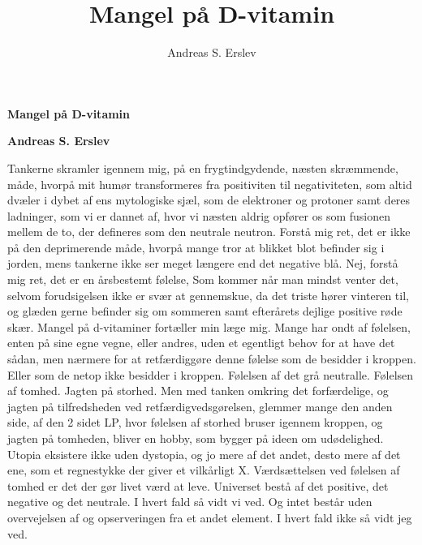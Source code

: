 \documentclass[]{article}
\title{Mangel på D-vitamin}
\author{Andreas S. Erslev}
\begin{document}
	
	\begin{center}
		\Large\textbf{Mangel på D-vitamin}
	\end{center}
	
	\begin{center}
		\large\textbf{Andreas S. Erslev}
	\end{center}
	
	Tankerne skramler igennem mig, på en frygtindgydende, næsten skræmmende, måde, hvorpå mit humør transformeres fra positiviten til negativiteten, som altid dvæler i dybet af ens mytologiske sjæl, som de elektroner og protoner samt deres ladninger, som vi er dannet af, hvor vi næsten aldrig opfører os som fusionen mellem de to, der defineres som den neutrale neutron.
	\newline
	\newline
	Forstå mig ret, det er ikke på den deprimerende måde, hvorpå mange tror at blikket blot befinder sig i jorden, mens tankerne ikke ser meget længere end det negative blå.
	\newline
	\newline
	Nej, forstå mig ret, det er en årsbestemt følelse, Som kommer når man mindst venter det, selvom forudsigelsen ikke er svær at gennemskue, da det triste hører vinteren til, og glæden gerne befinder sig om sommeren samt efterårets dejlige positive røde skær.
	\newline
	\newline
	Mangel på d-vitaminer fortæller min læge mig.
	\newline
	\newline
	Mange har ondt af følelsen, enten på sine egne vegne, eller andres, uden et egentligt behov for at have det sådan, men nærmere for at retfærdiggøre denne følelse som de besidder i kroppen. Eller som de netop ikke besidder i kroppen.
	\newline
	\newline
	Følelsen af det grå neutralle.
	\newline
	\newline
	Følelsen af tomhed. Jagten på storhed.
	\newline
	\newline
	Men med tanken omkring det forfærdelige, og jagten på tilfredsheden ved retfærdigvedsgørelsen, glemmer mange den anden side, af den 2 sidet LP, hvor følelsen af storhed bruser igennem kroppen, og jagten på tomheden, bliver en hobby, som bygger på ideen om udødelighed.
	\newline
	\newline
	Utopia eksistere ikke uden dystopia, og jo mere af det andet, desto mere af det ene, som et regnestykke der giver et vilkårligt X. Værdsættelsen ved følelsen af tomhed er det der gør livet værd at leve.
	\newline
	\newline
	Universet bestå af det positive, det negative og det neutrale. I hvert fald så vidt vi ved.
	\newline
	\newline
	Og intet består uden overvejelsen af og opserveringen fra et andet element. I hvert fald ikke så vidt jeg ved.
	
\end{document}
